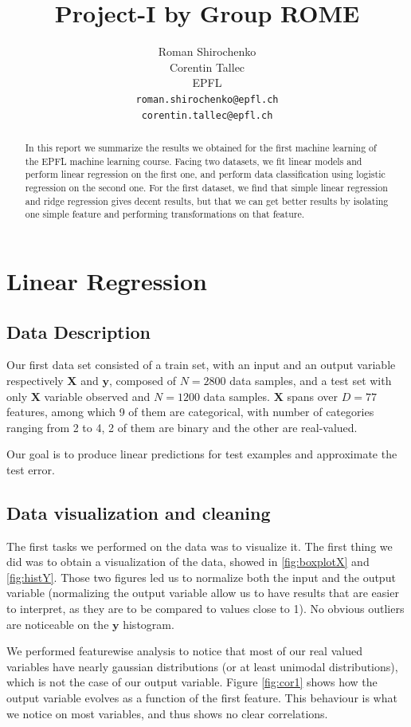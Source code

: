 \documentclass{article} %
\title{Project-I by Group ROME}
\author{
Roman Shirochenko\\
Corentin Tallec\\
EPFL \\
\texttt{roman.shirochenko@epfl.ch}\\
\texttt{corentin.tallec@epfl.ch} \\
}
\begin{document}
\maketitle

\begin{abstract}
	In this report we summarize the results we obtained for the first machine
	learning of the EPFL machine learning course. Facing two datasets, we fit
	linear models and perform linear regression on the first one, and perform data
	classification using logistic regression on the second one. For the first
	dataset, we find that simple linear regression and ridge regression gives
	decent results, but that we can get better results by isolating one simple
	feature and performing transformations on that feature.
\end{abstract}

\section{Linear Regression}
\subsection{Data Description}
Our first data set consisted of a train set, with an input and an output
variable respectively $\mathbf{X}$ and $\mathbf{y}$, composed of $N=2800$ data
samples, and a test set with only $\mathbf{X}$ variable observed and $N=1200$
data samples. $\mathbf{X}$ spans over $D=77$ features, among which 9 of them are
categorical, with number of categories ranging from 2 to 4, 2 of them are binary
and the other are real-valued.

Our goal is to produce linear predictions for test examples and approximate the
test error.

\subsection{Data visualization and cleaning}
The first tasks we performed on the data was to visualize it. The first thing we
did was to obtain a visualization of the data, showed in \ref{fig:boxplotX} and
\ref{fig:histY}. Those two figures led us to normalize both the input and the
output variable (normalizing the output variable allow us to have results that are
easier to interpret, as they are to be compared to values close to 1). No
obvious outliers are noticeable on the $\mathbf{y}$ histogram.

We performed featurewise analysis to notice that most of our real valued
variables have nearly gaussian distributions (or at least unimodal
distributions), which is not the case of our output variable. Figure
\ref{fig:cor1} shows how the output variable evolves as a function of the first
feature. This behaviour is what we notice on most variables, and thus shows no
clear correlations.
\end{document}
